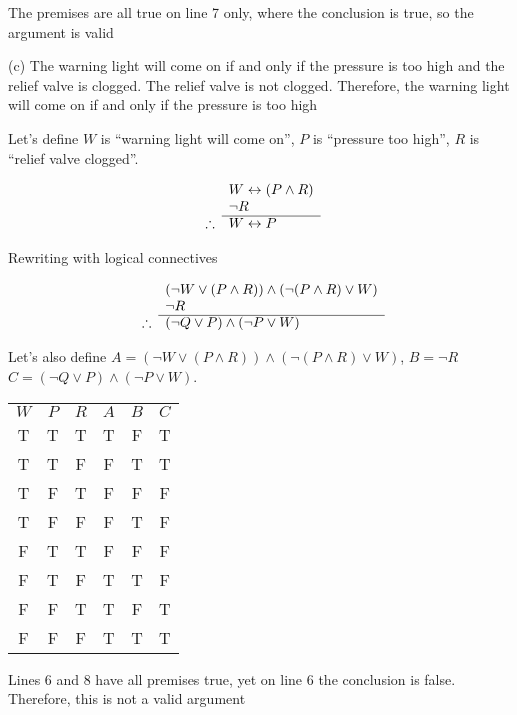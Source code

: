 \documentclass[11pt]{article}
\newcommand{\bicond}{\leftrightarrow}
\begin{document}
The premises are all true on line 7 only, where the conclusion is true, so the 
argument is valid

\noindent (c) The warning light will come on if and only if the pressure is too
high and the relief valve is clogged. The relief valve is not clogged. 
Therefore, the warning light will come on if and only if the pressure is too
high

Let's define
$W$ is ``warning light will come on'',
$P$ is ``pressure too high'',
$R$ is ``relief valve clogged''.

\[
  \begin{array}{ r l }
               & W \bicond (P \wedge R)\\
               & \neg R \\
    \cline{2-2}
    \therefore & W \bicond P
  \end{array}
\]

Rewriting with logical connectives 

\[
  \begin{array}{ r l }
               & (\neg W \vee (P \wedge R)) \wedge (\neg (P \wedge R) \vee W)\\
               & \neg R \\
    \cline{2-2}
    \therefore & (\neg Q \vee P) \wedge (\neg P \vee W)
  \end{array}
\]

Let's also define
$A = (\neg W \vee (P \wedge R)) \wedge (\neg (P \wedge R) \vee W)$,
$B = \neg R$
$C = (\neg Q \vee P) \wedge (\neg P \vee W)$.

\begin{center}
\begin{tabular}{ c c c c c c }
$W$ & $P$ & $R$ & $A$ & $B$ & $C$\\ 
T & T & T & T & F & T\\  
T & T & F & F & T & T\\
T & F & T & F & F & F\\  
T & F & F & F & T & F\\
F & T & T & F & F & F\\  
F & T & F & T & T & F\\
F & F & T & T & F & T\\  
F & F & F & T & T & T\\
\end{tabular}
\end{center}

Lines 6 and 8 have all premises true, yet on line 6 the conclusion is false. 
Therefore, this is not a valid argument
\end{document}
